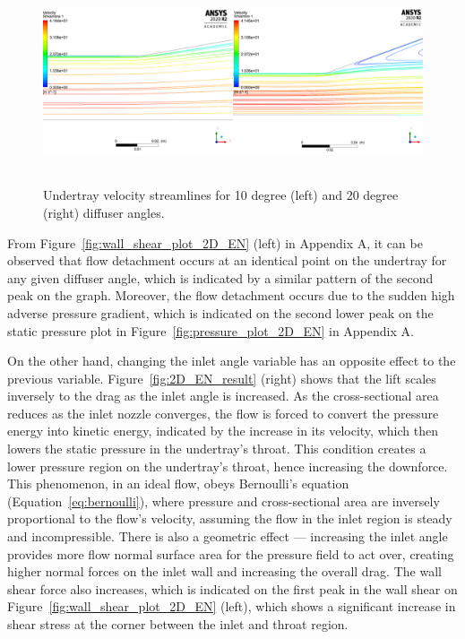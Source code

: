 \begin{figure}[!ht]
    \centering
    \includegraphics[height= 6cm]{Figures/2D_EN/2D_EN_Streamline_compare.PNG}
    \caption{Undertray velocity streamlines for 10 degree (left) and 20 degree (right) diffuser angles.}
    \label{fig:2D_EN_streamline_compare}
\end{figure}

\noindent From Figure~\ref{fig:wall_shear_plot_2D_EN} (left) in Appendix A, it can be observed that flow detachment occurs at an identical point on the undertray for any given diffuser angle, which is indicated by a similar pattern of the second peak on the graph. Moreover, the flow detachment occurs due to the sudden high adverse pressure gradient, which is indicated on the second lower peak on the static pressure plot in Figure~\ref{fig:pressure_plot_2D_EN} in Appendix A.

\noindent On the other hand, changing the inlet angle variable has an opposite effect to the previous variable. Figure~\ref{fig:2D_EN_result} (right) shows that the lift scales inversely to the drag as the inlet angle is increased. As the cross-sectional area reduces as the inlet nozzle converges, the flow is forced to convert the pressure energy into kinetic energy, indicated by the increase in its velocity, which then lowers the static pressure in the undertray's throat. This condition creates a lower pressure region on the undertray's throat, hence increasing the downforce. This phenomenon, in an ideal flow, obeys Bernoulli's equation (Equation~\ref{eq:bernoulli}), where pressure and cross-sectional area are inversely proportional to the flow's velocity, assuming the flow in the inlet region is steady and incompressible. There is also a geometric effect --- increasing the inlet angle provides more flow normal surface area for the pressure field to act over, creating higher normal forces on the inlet wall and increasing the overall drag. The wall shear force also increases, which is indicated on the first peak in the wall shear on Figure~\ref{fig:wall_shear_plot_2D_EN} (left), which shows a significant increase in shear stress at the corner between the inlet and throat region.

